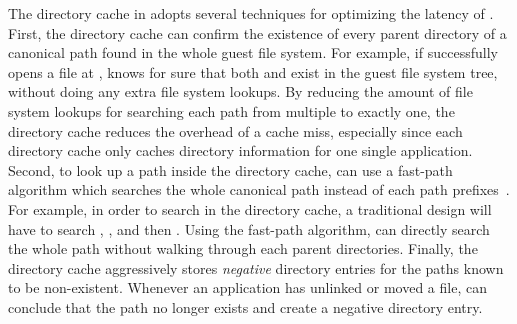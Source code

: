 The directory cache in \thelibos{} adopts several techniques for optimizing the latency of \linuxapis{}.
First, the directory cache
can confirm the existence of every parent directory
of a canonical path
found in the whole guest file system.
For example, if \thelibos{} successfully opens a file at ,
\thelibos{} knows for sure that both 
and  exist in the guest file system tree,
without doing any extra file system lookups.
By reducing the amount of file system lookups for searching each path
from multiple to exactly one,
the directory cache reduces the overhead of a cache miss,
especially since each directory cache
only caches directory information for one single application.
Second, to look up a path inside the directory cache,
\thelibos{} can use a fast-path algorithm which searches the whole canonical path
instead of each path prefixes~\cite{tsai15dcache}.
For example, in order to search  in the directory cache,
a traditional design will have to search
, , and then .
Using the fast-path algorithm,
\thelibos{} can directly search the whole path without walking through each parent directories.
Finally, the directory cache aggressively stores {\em negative} directory entries
for the paths known to be non-existent.
Whenever an application has unlinked or moved a file, \thelibos{} can conclude that the path no longer exists
and create a negative directory entry.






